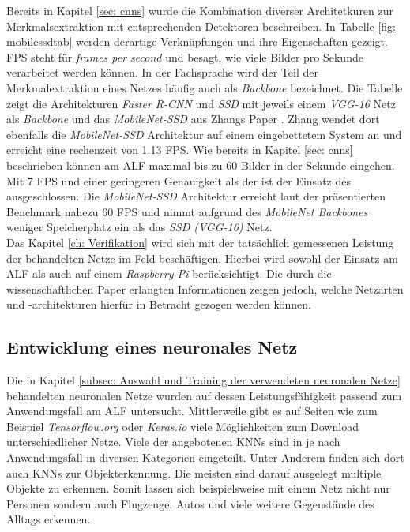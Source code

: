 		Bereits in Kapitel \ref{sec: cnns} wurde die Kombination diverser Architetkuren zur Merkmalsextraktion mit entsprechenden Detektoren beschreiben. In Tabelle \ref{fig: mobilessdtab} werden derartige Verknüpfungen und ihre Eigenschaften gezeigt. FPS steht für \textit{frames per second} und besagt, wie viele Bilder pro Sekunde verarbeitet werden können. In der Fachsprache wird der Teil der Merkmalextraktion eines Netzes häufig auch als \textit{Backbone} bezeichnet. Die Tabelle zeigt die Architekturen \textit{Faster R-CNN} und \textit{SSD} mit jeweils einem \textit{VGG-16} Netz als \textit{Backbone} und das \textit{MobileNet-SSD} aus Zhangs Paper \cite{embedded}. Zhang wendet dort ebenfalls die \textit{MobileNet-SSD} Architektur auf einem eingebettetem System an und erreicht eine rechenzeit von 1.13 FPS. Wie bereits in Kapitel \ref{sec: cnns} beschrieben können am ALF maximal bis zu 60 Bilder in der Sekunde eingehen. Mit 7 FPS und einer geringeren Genauigkeit als der  ist der Einsatz des  ausgeschlossen. Die \textit{MobileNet-SSD} Architektur erreicht laut der präsentierten Benchmark nahezu 60 FPS und nimmt aufgrund des \textit{MobileNet Backbones} weniger Speicherplatz ein als das \textit{SSD (VGG-16)} Netz. \\ 
		
		Das Kapitel \ref{ch: Verifikation} wird sich mit der tatsächlich gemessenen Leistung der behandelten Netze im Feld beschäftigen. Hierbei wird sowohl der Einsatz am ALF als auch auf einem \textit{Raspberry Pi} berücksichtigt. Die durch die wissenschaftlichen Paper erlangten Informationen zeigen jedoch, welche Netzarten und -architekturen hierfür in Betracht gezogen werden können.
		
		\subsection{Entwicklung eines neuronales Netz}
		\label{subsec: Entwickeltes neuronales Netz}
		
		Die in Kapitel \ref{subsec: Auswahl und Training der verwendeten neuronalen Netze} behandelten neuronalen Netze wurden auf dessen Leistungsfähigkeit passend zum Anwendungsfall am ALF untersucht. Mittlerweile gibt es auf Seiten wie zum Beispiel \textit{Tensorflow.org} oder \textit{Keras.io} viele Möglichkeiten zum Download unterschiedlicher Netze. Viele der angebotenen KNNs sind in je nach Anwendungsfall in diversen Kategorien eingeteilt. Unter Anderem finden sich dort auch KNNs zur Objekterkennung. Die meisten sind darauf ausgelegt multiple Objekte zu erkennen. Somit lassen sich beispielsweise mit einem Netz nicht nur Personen sondern auch Flugzeuge, Autos und viele weitere Gegenstände des Alltags erkennen. \\ 
		
